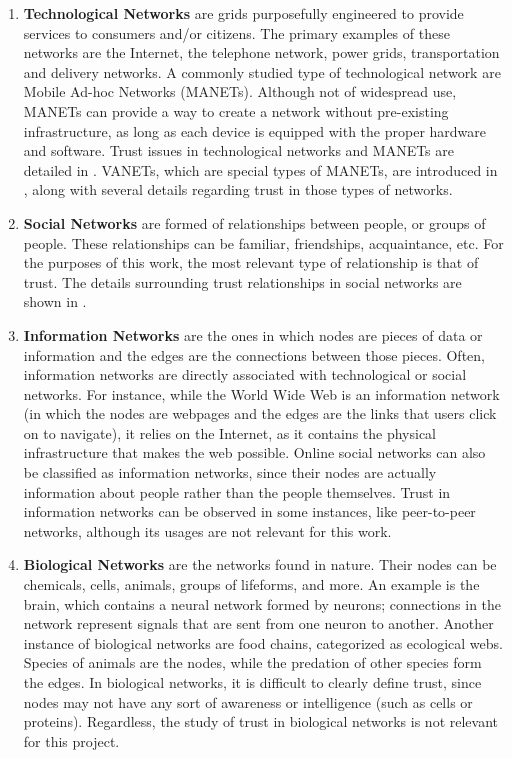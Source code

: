 \begin{enumerate}
	\item \textbf{Technological Networks} are grids purposefully engineered to provide services to consumers and/or citizens.
	 	The primary examples of these networks are the Internet, the telephone network, power grids, transportation and delivery networks.
	 	A commonly studied type of technological network are Mobile Ad-hoc Networks (MANETs).
		Although not of widespread use, MANETs can provide a way to create a network without pre-existing infrastructure, as long as each device is equipped with the proper hardware and software.
		Trust issues in technological networks and MANETs are detailed in .
		VANETs, which are special types of MANETs, are introduced in , along with several details regarding trust in those types of networks.
	\item \textbf{Social Networks} are formed of relationships between people, or groups of people.
		These relationships can be familiar, friendships, acquaintance, etc.
		For the purposes of this work, the most relevant type of relationship is that of trust.
		The details surrounding trust relationships in social networks are shown in .
	\item \textbf{Information Networks} are the ones in which nodes are pieces of data or information and the edges are the connections between those pieces.
		Often, information networks are directly associated with technological or social networks.
		For instance, while the World Wide Web is an information network (in which the nodes are webpages and the edges are the links that users click on to navigate), it relies on the Internet, as it contains the physical infrastructure that makes the web possible.
		Online social networks can also be classified as information networks, since their nodes are actually information about people rather than the people themselves.
		Trust in information networks can be observed in some instances, like peer-to-peer networks, although its usages are not relevant for this work.
	\item \textbf{Biological Networks} are the networks found in nature.
		Their nodes can be chemicals, cells, animals, groups of lifeforms, and more.
		An example is the brain, which contains a neural network formed by neurons; connections in the network represent signals that are sent from one neuron to another.
		Another instance of biological networks are food chains, categorized as ecological webs.
		Species of animals are the nodes, while the predation of other species form the edges.
		In biological networks, it is difficult to clearly define trust, since nodes may not have any sort of awareness or intelligence (such as cells or proteins).
		Regardless, the study of trust in biological networks is not relevant for this project.
		
\end{enumerate}

